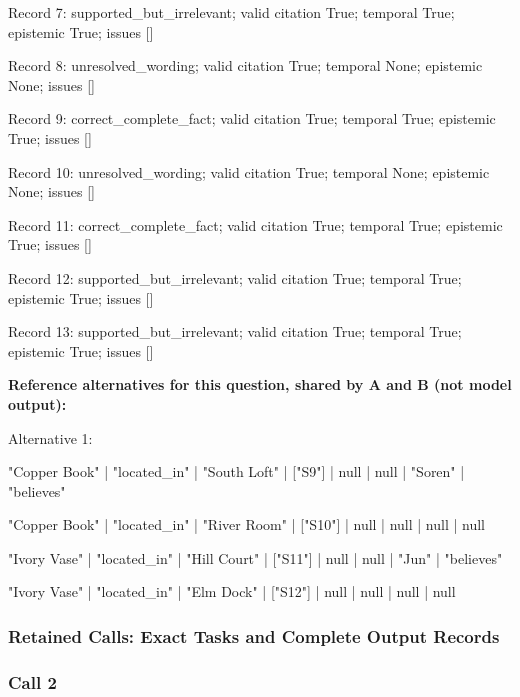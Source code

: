 Record 7: supported\_but\_irrelevant; valid citation True; temporal True; epistemic True; issues []\par

Record 8: unresolved\_wording; valid citation True; temporal None; epistemic None; issues []\par

Record 9: correct\_complete\_fact; valid citation True; temporal True; epistemic True; issues []\par

Record 10: unresolved\_wording; valid citation True; temporal None; epistemic None; issues []\par

Record 11: correct\_complete\_fact; valid citation True; temporal True; epistemic True; issues []\par

Record 12: supported\_but\_irrelevant; valid citation True; temporal True; epistemic True; issues []\par

Record 13: supported\_but\_irrelevant; valid citation True; temporal True; epistemic True; issues []\par

\noindent\textbf{Reference alternatives for this question, shared by A and B (not model output):}

\noindent Alternative 1:

"Copper Book" | "located\_in" | "South Loft" | ["S9"] | null | null | "Soren" | "believes"\par\smallskip

"Copper Book" | "located\_in" | "River Room" | ["S10"] | null | null | null | null\par\smallskip

"Ivory Vase" | "located\_in" | "Hill Court" | ["S11"] | null | null | "Jun" | "believes"\par\smallskip

"Ivory Vase" | "located\_in" | "Elm Dock" | ["S12"] | null | null | null | null\par\smallskip

\subsubsection*{Retained Calls: Exact Tasks and Complete Output Records}

\subsubsection*{Call 2}

